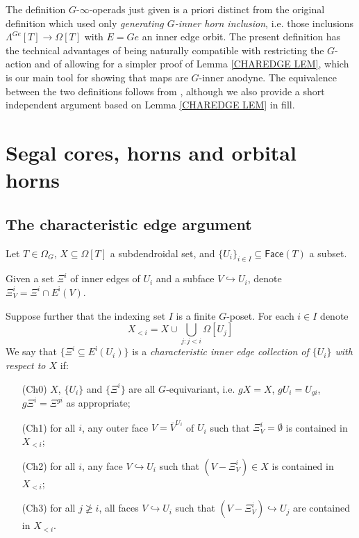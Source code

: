 \documentclass[a4paper,10pt,draft]{article}%
\begin{document}
\begin{remark}
The definition $G$-$\infty$-operads just given is a priori distinct from the original definition \cite[Def. 6.12]{Per17} which used only 
\textit{generating $G$-inner horn inclusion}, i.e. 
those inclusions $\Lambda^{Ge}[T] \to \Omega[T]$ with $E=Ge$ an inner edge orbit.
The present definition has the technical advantages of being naturally compatible with restricting the $G$-action and of allowing for a simpler proof of Lemma \ref{CHAREDGE LEM}, 
which is our main tool for showing that maps
are $G$-inner anodyne.
The equivalence between the two definitions follows from 
\cite[Prop. 6.17]{Per17},
although we also provide a short independent argument
based on Lemma \ref{CHAREDGE LEM} in {\color{blue} fill}.
\end{remark}











\section{Segal cores, horns and orbital horns}


\subsection{The characteristic edge argument}

\begin{definition}\label{CHAREDGE DEF}
      Let $T \in \Omega_G$, $X \subseteq \Omega[T]$ a subdendroidal set, and $\{U_i\}_{i \in I} \subseteq \mathsf{Face}(T)$ a subset.

      Given a set $\Xi^i$ of inner edges of $U_i$ and a subface $V \hookrightarrow U_i$, denote $\Xi_V^i = \Xi^i \cap E^{\mathsf{i}}(V)$.

      Suppose further that the indexing set $I$ is a 
      finite $G$-poset. For each $i \in I$ denote
      \[
            X_{<i} = X \cup \bigcup_{j \colon j<i} \Omega[U_j]
      \]
      We say that $\{\Xi^i \subseteq E^{\mathsf{i}}(U_i)\}$ 
      is a \textit{characteristic inner edge collection of $\{U_i\}$ with respect to $X$} if:
      \begin{itemize}
      \item[(Ch0)] $X$, $\{U_i\}$ and $\{\Xi^i\}$ are all $G$-equivariant, i.e. $g X = X$, $g U_i = U_{gi}$, $g \Xi^i = \Xi^{gi}$ as appropriate; 
      \item[(Ch1)] for all $i$, any outer face $V = \bar{V}^{U_i}$
            of $U_i$ such that $\Xi_{V}^i = \emptyset$
            is contained in $X_{<i}$;
      \item[(Ch2)] for all $i$, any face
            $V \hookrightarrow U_i$ such that $(V-\Xi_V^i) \in X$
            is contained in $X_{<i}$;
      \item[(Ch3)] for all $j \not \geq i$, 
            all faces $V \hookrightarrow U_i$ such that 
            $(V-\Xi^i_V) \hookrightarrow U_j$
            are contained in $X_{<i}$.
      \end{itemize}
\end{definition}
\end{document}
